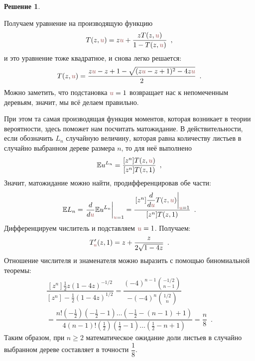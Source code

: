 \documentclass[a5paper]{article}
\theoremstyle{definition}
\newtheorem*{solution}{Решение}
\begin{document}
\begin{solution}
\begin{figure}[hbt]
\centering
{}
\end{figure}
Получаем уравнение на производящую функцию
\begin{equation}
    T(z, \uu) = z \uu + \dfrac{z T(z, \uu)}{1 - T(z, \uu)}
    \enspace ,
\end{equation}
и это уравнение тоже квадратное, и снова легко решается:
\begin{equation}
    T(z, \uu) = \dfrac{z\uu - z + 1 - \sqrt{(z\uu-z+1)^2-4z\uu}}{2}
    \enspace .
\end{equation}
Можно заметить, что подстановка \( \uu = 1 \) возвращает нас к непомеченным
деревьям, значит, мы всё делаем правильно.

При этом та самая производящая функция моментов, которая возникает в теории
вероятности, здесь поможет нам посчитать матожидание. В действительности, 
если обозначить \( L_n \) случайную величину, которая равна количеству листьев в
случайно выбранном дереве размера \( n \), то для неё выполнено
\begin{equation}
    \mathbb E u^{L_n} = \dfrac{[z^n] T(z, \uu)}{[z^n]T(z,1)} 
    \enspace ,
\end{equation}
Значит, матожидание можно найти, продифференцировав обе части:
\begin{equation}
    \mathbb E L_n = \left. \dfrac{d}{d \uu} \mathbb E u^{L_n} \right|_{\uu = 1}
    = \dfrac
        {\left. [z^n] \dfrac{d}{d \uu} T(z, \uu)\right|_{\uu = 1}}
        {[z^n] T(z, 1)}
    \enspace .
\end{equation}
Дифференцируем числитель и подставляем \( \uu = 1 \). Получаем:
\begin{equation}
    T'_{\uu}(z, 1) = z + \dfrac{z}{2 \sqrt{1 - 4z}} \enspace .
\end{equation}
Отношение числителя и знаменателя можно выразить с помощью биномиальной теоремы:
\begin{multline*}
    \dfrac
        { [z^n] \tfrac12 z(1-4z)^{-1/2} }
        { [z^n] -\tfrac12 (1-4z)^{1/2} }
    = 
    \dfrac
        { (-4)^{n-1} {-1/2 \choose n-1} }
        { -(-4)^n {1/2 \choose n} }
    \\=
    \dfrac{n! (-\tfrac12)(-\tfrac12-1) \ldots (-\tfrac12 - (n-1) + 1)}
    {4(n-1)! (\tfrac12)(\tfrac12 - 1) \ldots (\tfrac12 - n + 1)}
    = \dfrac{n}{8}
    \enspace .
\end{multline*}
Таким образом, при \( n \geq 2 \) математическое ожидание доли листьев в случайно
выбранном дереве составляет в точности \( \dfrac18 \).


\end{solution}
\end{document}
